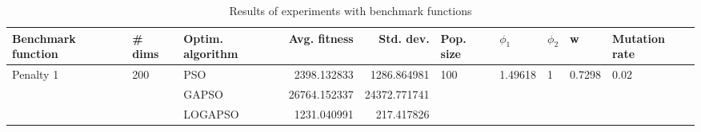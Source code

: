 \begin{table}
\centering
\caption{Results of experiments with benchmark functions}
\begin{tabular}{lllrrlllll}
\toprule
        Benchmark function &              \# dims & Optim. algorithm &  Avg. fitness &    Std. dev. &            Pop. size &               $\phi_{1}$ &         $\phi_{2}$ &                       w &         Mutation rate \\
\midrule
\multirow{3}{*}{Penalty 1} & \multirow{3}{*}{200} &              PSO &   2398.132833 &  1286.864981 & \multirow{3}{*}{100} & \multirow{3}{*}{1.49618} & \multirow{3}{*}{1} & \multirow{3}{*}{0.7298} & \multirow{3}{*}{0.02} \\
                           &                      &            GAPSO &  26764.152337 & 24372.771741 &                      &                          &                    &                         &                       \\
                           &                      &          LOGAPSO &   1231.040991 &   217.417826 &                      &                          &                    &                         &                       \\
\bottomrule
\end{tabular}
\end{table}
